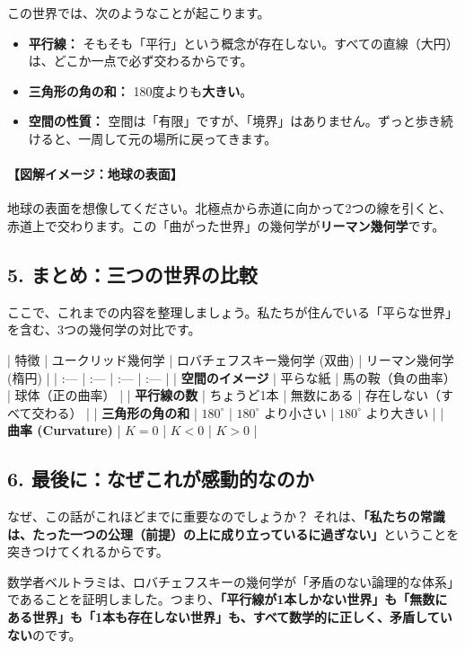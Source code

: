 \documentclass[a4paper,11pt,openany]{ltjsbook}
\begin{document}
\begin{lecturebox}
この世界では、次のようなことが起こります。
\begin{itemize}[leftmargin=2em]
\item \textbf{平行線：} そもそも「平行」という概念が存在しない。すべての直線（大円）は、どこか一点で必ず交わるからです。
\item \textbf{三角形の角の和：} 180度よりも\textbf{大きい}。
\item \textbf{空間の性質：} 空間は「有限」ですが、「境界」はありません。ずっと歩き続けると、一周して元の場所に戻ってきます。
\end{itemize}

\paragraph{【図解イメージ：地球の表面】}
地球の表面を想像してください。北極点から赤道に向かって2つの線を引くと、赤道上で交わります。この「曲がった世界」の幾何学が\textbf{リーマン幾何学}です。

\subsection*{5. まとめ：三つの世界の比較}

ここで、これまでの内容を整理しましょう。私たちが住んでいる「平らな世界」を含む、3つの幾何学の対比です。

| 特徴 | ユークリッド幾何学 | ロバチェフスキー幾何学 (双曲) | リーマン幾何学 (楕円) |
| :--- | :--- | :--- | :--- |
| \textbf{空間のイメージ} | 平らな紙 | 馬の鞍（負の曲率） | 球体（正の曲率） |
| \textbf{平行線の数} | ちょうど1本 | 無数にある | 存在しない（すべて交わる） |
| \textbf{三角形の角の和} | $180^\circ$ | $180^\circ$ より小さい | $180^\circ$ より大きい |
| \textbf{曲率 (Curvature)} | $K = 0$ | $K < 0$ | $K > 0$ |

\subsection*{6. 最後に：なぜこれが感動的なのか}

なぜ、この話がこれほどまでに重要なのでしょうか？
それは、\textbf{「私たちの常識は、たった一つの公理（前提）の上に成り立っているに過ぎない」}ということを突きつけてくれるからです。

数学者ベルトラミは、ロバチェフスキーの幾何学が「矛盾のない論理的な体系」であることを証明しました。つまり、\textbf{「平行線が1本しかない世界」も「無数にある世界」も「1本も存在しない世界」も、すべて数学的に正しく、矛盾していない}のです。


\end{lecturebox}
\end{document}
